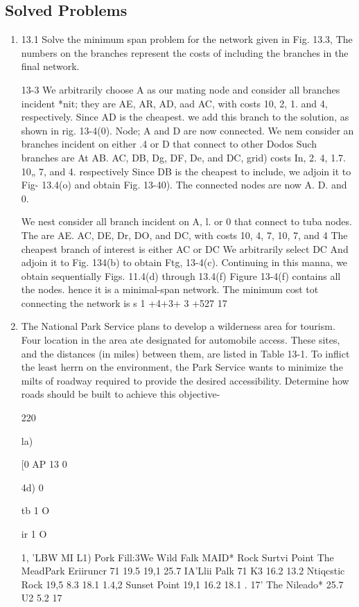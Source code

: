 \documentclass[11pt]{article} %
\begin{document}
\subsection{Solved Problems}
\begin{enumerate}
\item 13.1 Solve the minimum span problem for the network given in Fig. 13.3, The numbers on the branches represent the costs of including the branches in the final network. 

13-3 
We arbitrarily choose A as our mating node and consider all branches incident *nit; they are AE, AR, AD, aad AC, with costs 10, 2, 1. and 4, respectively. Since AD is the cheapest. we add this branch to the solution, as shown in rig. 13-4(0). Node; A and D are now connected. We nem consider an branches incident on either .4 or D that connect to other Dodos Such branches are At AB. AC, DB, Dg, DF, De, and DC, grid) costs In, 2. 4, 1.7. 10„ 7, and 4. respectively Since DB is the cheapest to include, we adjoin it to Fig- 13.4(o) and obtain Fig. 13-40). The connected nodes are now A. D. and 0. 

We nest consider all branch incident on A, l. or 0 that connect to tuba nodes. The are AE. AC, DE, Dr, DO, and DC, with costs 10, 4, 7, 10, 7, and 4 The cheapest branch of interest is either AC or DC We arbitrarily select DC And adjoin it to Fig. 134(b) to obtain Ftg, 13-4(c). Continuing in this manna, we obtain sequentially Figs. 11.4(d) through 13.4(f) Figure 13-4(f) contains all the nodes. hence it is a minimal-span network. The minimum cost tot connecting the network is 
s 1 +4+3+ 3 +527 17 
\item  The National Park Service plans to develop a wilderness area for tourism. Four location in the area ate designated for automobile access. These sites, and the distances (in miles) between them, are listed in Table 13-1. To inflict the least herrn on the environment, the Park Service wants to minimize the milts of roadway required to provide the desired accessibility. Determine how roads should be built to achieve this objective-


220 

la) 

[0 AP 13 
0 

4d) 
0 

tb 1 
O 

ir 1 
O 

1,%
'LBW MI 
L1) 
Pork Fill:3We Wild Falk MAID* Rock Surtvi Point The MeadPark Eriiruncr 71 19.5 19,1 25.7 IA'Llii Palk 71 K3 16.2 13.2 Ntiqcstic Rock 19,5 8.3 18.1 1.4,2 Sunset Point 19,1 16.2 18.1 . 17' The Nileado* 25.7 U2 5.2 17 



\end{enumerate}
\end{document}
